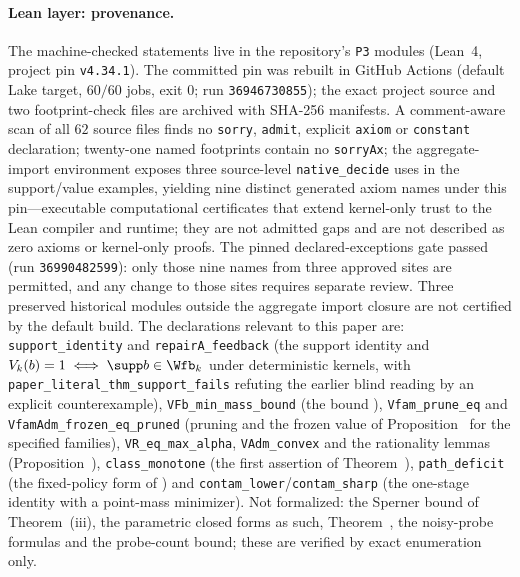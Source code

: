 \paragraph{Lean layer: provenance.} The machine-checked statements live in the repository's \texttt{P3} modules (Lean~4, project pin \texttt{v4.34.1}). The committed pin was rebuilt in GitHub Actions (default Lake target, $60/60$ jobs, exit $0$; run \texttt{36946730855}); the exact project source and two footprint-check files are archived with SHA-256 manifests. A comment-aware scan of all $62$ source files finds no \texttt{sorry}, \texttt{admit}, explicit \texttt{axiom} or \texttt{constant} declaration; twenty-one named footprints contain no \texttt{sorryAx}; the aggregate-import environment exposes three source-level \texttt{native\_decide} uses in the support/value examples, yielding nine distinct generated axiom names under this pin---executable computational certificates that extend kernel-only trust to the Lean compiler and runtime; they are not admitted gaps and are not described as zero axioms or kernel-only proofs. The pinned declared-exceptions gate passed (run \texttt{36990482599}): only those nine names from three approved sites are permitted, and any change to those sites requires separate review. Three preserved historical modules outside the aggregate import closure are not certified by the default build. The declarations relevant to this paper are: \texttt{support\_identity} and \texttt{repairA\_feedback} (the support identity  and $V_k(b)=1\iff\supp b\in\Wfb_k$ under deterministic kernels, with \texttt{paper\_literal\_thm\_support\_fails} refuting the earlier blind reading by an explicit counterexample), \texttt{VFb\_min\_mass\_bound} (the bound ), \texttt{Vfam\_prune\_eq} and \texttt{VfamAdm\_frozen\_eq\_pruned} (pruning and the frozen value of Proposition~ for the specified families), \texttt{VR\_eq\_max\_alpha}, \texttt{VAdm\_convex} and the rationality lemmas (Proposition~), \texttt{class\_monotone} (the first assertion of Theorem~), \texttt{path\_deficit} (the fixed-policy form of ) and \texttt{contam\_lower}/\texttt{contam\_sharp} (the one-stage identity  with a point-mass minimizer). Not formalized: the Sperner bound of Theorem~(iii), the parametric closed forms as such, Theorem~, the noisy-probe formulas and the probe-count bound; these are verified by exact enumeration only.

